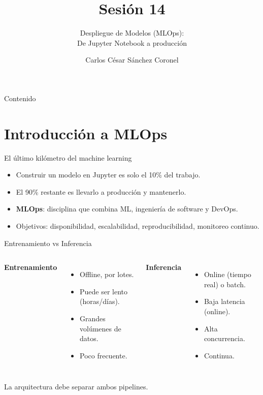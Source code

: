 \documentclass[aspectratio=169, 10pt, xcolor=table]{beamer}
\title[SESIÓN 14]{\textbf{Sesión 14}}
\subtitle{Despliegue de Modelos (MLOps): \\ De Jupyter Notebook a producción}
\author[Prof. C. Sánchez]{Carlos César Sánchez Coronel}
\institute{\textbf{MACHINE LEARNING}}
\date{}
\begin{document}
\begin{frame}
    \titlepage
\end{frame}

\begin{frame}{Contenido}
    \tableofcontents
\end{frame}

\section{Introducción a MLOps}

\begin{frame}{El último kilómetro del machine learning}
    \begin{itemize}
        \item Construir un modelo en Jupyter es solo el 10\% del trabajo.
        \item El 90\% restante es llevarlo a producción y mantenerlo.
        \item \textbf{MLOps}: disciplina que combina ML, ingeniería de software y DevOps.
        \item Objetivos: disponibilidad, escalabilidad, reproducibilidad, monitoreo continuo.
    \end{itemize}
\end{frame}

\begin{frame}{Entrenamiento vs Inferencia}
    \begin{columns}[t]
        \textbf{Entrenamiento}
        \begin{itemize}
            \item Offline, por lotes.
            \item Puede ser lento (horas/días).
            \item Grandes volúmenes de datos.
            \item Poco frecuente.
        \end{itemize}
        \textbf{Inferencia}
        \begin{itemize}
            \item Online (tiempo real) o batch.
            \item Baja latencia (online).
            \item Alta concurrencia.
            \item Continua.
        \end{itemize}
    \end{columns}
    \vspace{0.3cm}
    La arquitectura debe separar ambos pipelines.
\end{frame}
\end{document}
